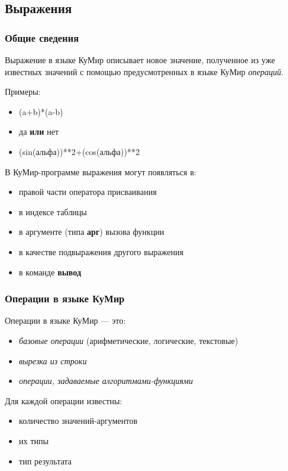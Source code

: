 \subsection{Выражения}
\label{expressions}

\subsubsection{Общие сведения}

	Выражение в языке КуМир описывает новое значение, полученное из уже известных значений с помощью предусмотренных в языке КуМир \emph{операций}.

	Примеры:
\begin{itemize}
\item \textsf{(a+b)*(a-b)}
\item \textsf{да \textbf{или} нет}
\item \textsf{(sin(альфа))**2+(cos(альфа))**2}
\end{itemize}
	
	В КуМир-программе выражения могут появляться в:
\begin{itemize}
\item правой части оператора присваивания
\item в индексе таблицы
\item в аргументе (типа \textbf{арг}) вызова функции
\item в качестве подвыражения другого выражения
\item в команде \textbf{вывод}
\end{itemize}

\subsubsection{Операции в языке КуМир}

	Операции в языке КуМир --- это:
\begin{itemize}
\item \emph{базовые операции} (арифметические, логические, текстовые)
\item \emph{вырезка из строки}
\item \emph{операции, задаваемые алгоритмами-функциями}
\end{itemize}

	Для каждой операции известны:
\begin{itemize}
\item количество значений-аргументов
\item их типы
\item тип результата
\end{itemize}
	
